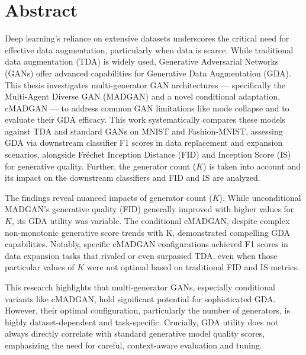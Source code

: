 \section*{Abstract}
\pagestyle{empty}
Deep learning's reliance on extensive datasets underscores the critical need for effective data augmentation, particularly when data is scarce. While traditional data augmentation (TDA) is widely used, Generative Adversarial Networks (GANs) offer advanced capabilities for Generative Data Augmentation (GDA). This thesis investigates multi-generator GAN architectures — specifically the Multi-Agent Diverse GAN (MADGAN) and a novel conditional adaptation, cMADGAN — to address common GAN limitations like mode collapse and to evaluate their GDA efficacy. This work systematically compares these models against TDA and standard GANs on MNIST and Fashion-MNIST, assessing GDA via downstream classifier F1 scores in data replacement and expansion scenarios, alongside Fréchet Inception Distance (FID) and Inception Score (IS) for generative quality. Further, the generator count (\(K\)) is taken into account and its impact on the downstream classifiers and FID and IS are analyzed.

The findings reveal nuanced impacts of generator count (\(K\)). While unconditional \\MADGAN's generative quality (FID) generally improved with higher values for \(K\), its GDA utility was variable. The conditional cMADGAN, despite complex non-monotonic generative score trends with K, demonstrated compelling GDA capabilities. Notably, specific cMADGAN configurations achieved F1 scores in data expansion tasks that rivaled or even surpassed TDA, even when those particular values of \(K\) were not optimal based on traditional FID and IS metrics.

This research highlights that multi-generator GANs, especially conditional variants like cMADGAN, hold significant potential for sophisticated GDA. However, their optimal configuration, particularly the number of generators, is highly dataset-dependent and task-specific. Crucially, GDA utility does not always directly correlate with standard generative model quality scores, emphasizing the need for careful, context-aware evaluation and tuning.
